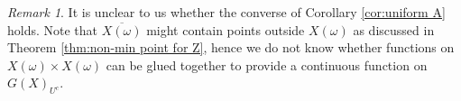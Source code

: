 \documentclass[12pt, a4paper]{amsart}
\numberwithin{equation}{section}
\newtheorem{lem}[thm]{Lemma}
\theoremstyle{definition}
\theoremstyle{remark}
\newtheorem{rem}[thm]{Remark}
\def\supp{\mathrm{supp}}
\begin{document}
\begin{rem}
It is unclear to us whether the converse of Corollary \ref{cor:uniform A} holds. Note that $\overline{X(\omega)}$ might contain points outside $X(\omega)$ as discussed in Theorem \ref{thm:non-min point for Z}, hence we do not know whether functions on $X(\omega) \times X(\omega)$ can be glued together to provide a continuous function on $G(X)_{U^c}$.
\end{rem}


%
\end{document}
